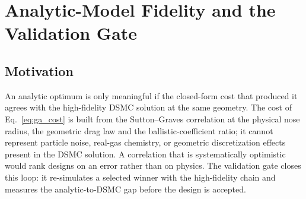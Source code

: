 \section{Analytic-Model Fidelity and the Validation Gate}
\label{sec:hybrid_gate}

\subsection{Motivation}
An analytic optimum is only meaningful if the closed-form cost that produced it agrees with the high-fidelity DSMC solution at the same geometry. The cost of Eq.~\eqref{eq:ga_cost} is built from the Sutton--Graves correlation at the physical nose radius, the geometric drag law and the ballistic-coefficient ratio; it cannot represent particle noise, real-gas chemistry, or geometric discretization effects present in the DSMC solution. A correlation that is systematically optimistic would rank designs on an error rather than on physics. The validation gate closes this loop: it re-simulates a selected winner with the high-fidelity chain and measures the analytic-to-DSMC gap before the design is accepted.

